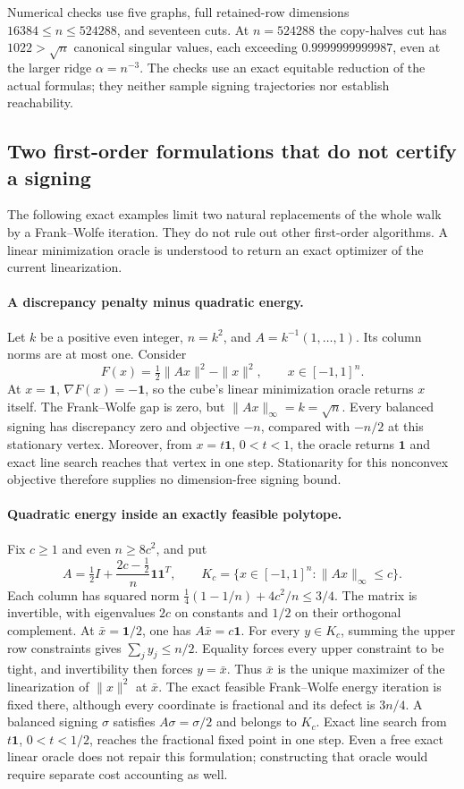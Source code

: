 \documentclass[11pt]{amsart}
\theoremstyle{definition}\newtheorem{definition}[theorem]{Definition}
\theoremstyle{remark}\newtheorem{remark}[theorem]{Remark}
\numberwithin{equation}{section}
\newcommand{\one}{\mathbf1}
\begin{document}
Numerical checks use five graphs, full retained-row dimensions
$16384\le n\le524288$, and seventeen cuts.  At $n=524288$ the
copy-halves cut has $1022>\sqrt n$ canonical singular values, each
exceeding $0.9999999999987$, even at the larger ridge $\alpha=n^{-3}$.
The checks use an exact equitable reduction of the actual formulas;
they neither sample signing trajectories nor establish reachability.


\subsection{Two first-order formulations that do not certify a signing}
\label{new:fw}
The following exact examples limit two natural replacements of the whole
walk by a Frank--Wolfe iteration. They do not rule out other first-order
algorithms. A linear minimization oracle is understood to return an exact
optimizer of the current linearization.

\paragraph{A discrepancy penalty minus quadratic energy.}
Let $k$ be a positive even integer, $n=k^2$, and
$A=k^{-1}(1,\ldots,1)$. Its column norms are at most one. Consider
\[
 F(x)=\tfrac12\|Ax\|^2-\|x\|^2,\qquad x\in[-1,1]^n.
\]
At $x=\one$, $\nabla F(x)=-\one$, so the cube's linear minimization
oracle returns $x$ itself. The Frank--Wolfe gap is zero, but
$\|Ax\|_\infty=k=\sqrt n$. Every balanced signing has discrepancy zero
and objective $-n$, compared with $-n/2$ at this stationary vertex.
Moreover, from $x=t\one$, $0<t<1$, the oracle returns $\one$ and exact
line search reaches that vertex in one step. Stationarity for this
nonconvex objective therefore supplies no dimension-free signing bound.

\paragraph{Quadratic energy inside an exactly feasible polytope.}
Fix $c\ge1$ and even $n\ge8c^2$, and put
\[
 A=\tfrac12I+\frac{2c-\tfrac12}{n}\one\one^T,
 \qquad K_c=\{x\in[-1,1]^n:\|Ax\|_\infty\le c\}.
\]
Each column has squared norm
$\tfrac14(1-1/n)+4c^2/n\le3/4$. The matrix is invertible, with
eigenvalues $2c$ on constants and $1/2$ on their orthogonal complement.
At $\bar x=\one/2$, one has $A\bar x=c\one$.
For every $y\in K_c$, summing the upper row constraints gives
$\sum_jy_j\le n/2$. Equality forces every upper constraint to be tight,
and invertibility then forces $y=\bar x$. Thus $\bar x$ is the unique
maximizer of the linearization of $\|x\|^2$ at $\bar x$.
The exact feasible Frank--Wolfe energy iteration is fixed there, although
every coordinate is fractional and its defect is $3n/4$.
A balanced signing $\sigma$ satisfies $A\sigma=\sigma/2$ and belongs to
$K_c$. Exact line search from $t\one$, $0<t<1/2$, reaches the fractional
fixed point in one step. Even a free exact linear oracle does not repair
this formulation; constructing that oracle would require separate cost
accounting as well.
\end{document}
